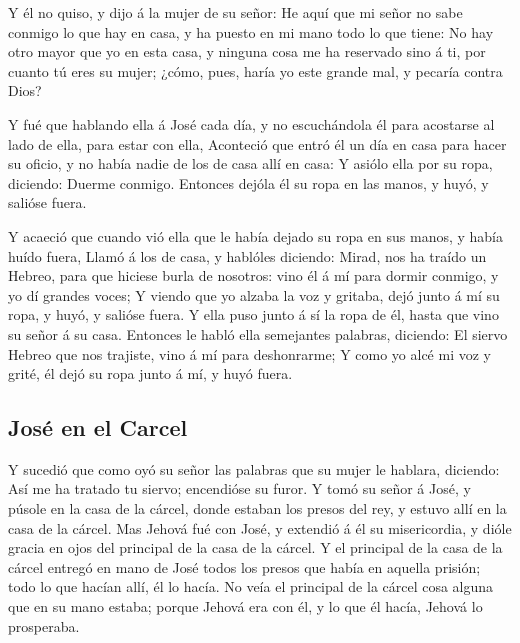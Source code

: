  Y él no quiso, y dijo á la mujer de su señor: He aquí que
mi señor no sabe conmigo lo que hay en casa, y ha puesto en mi mano todo
lo que tiene:  No hay otro mayor que yo en esta casa, y
ninguna cosa me ha reservado sino á ti, por cuanto tú eres su mujer;
¿cómo, pues, haría yo este grande mal, y pecaría contra Dios?

 Y fué que hablando ella á José cada día, y no
escuchándola él para acostarse al lado de ella, para estar con ella,
 Aconteció que entró él un día en casa para hacer su
oficio, y no había nadie de los de casa allí en casa:  Y
asiólo ella por su ropa, diciendo: Duerme conmigo. Entonces dejóla él su
ropa en las manos, y huyó, y salióse fuera.

 Y acaeció que cuando vió ella que le había dejado su
ropa en sus manos, y había huído fuera,  Llamó á los de
casa, y hablóles diciendo: Mirad, nos ha traído un Hebreo, para que
hiciese burla de nosotros: vino él á mí para dormir conmigo, y yo dí
grandes voces;  Y viendo que yo alzaba la voz y gritaba,
dejó junto á mí su ropa, y huyó, y salióse fuera.  Y ella
puso junto á sí la ropa de él, hasta que vino su señor á su casa.
 Entonces le habló ella semejantes palabras, diciendo: El
siervo Hebreo que nos trajiste, vino á mí para deshonrarme;
 Y como yo alcé mi voz y grité, él dejó su ropa junto á
mí, y huyó fuera.

\hypertarget{josuxe9-en-el-carcel}{%
\subsection{José en el Carcel}\label{josuxe9-en-el-carcel}}

 Y sucedió que como oyó su señor las palabras que su
mujer le hablara, diciendo: Así me ha tratado tu siervo; encendióse su
furor.  Y tomó su señor á José, y púsole en la casa de la
cárcel, donde estaban los presos del rey, y estuvo allí en la casa de la
cárcel.  Mas Jehová fué con José, y extendió á él su
misericordia, y dióle gracia en ojos del principal de la casa de la
cárcel.  Y el principal de la casa de la cárcel entregó
en mano de José todos los presos que había en aquella prisión; todo lo
que hacían allí, él lo hacía.  No veía el principal de la
cárcel cosa alguna que en su mano estaba; porque Jehová era con él, y lo
que él hacía, Jehová lo prosperaba.

